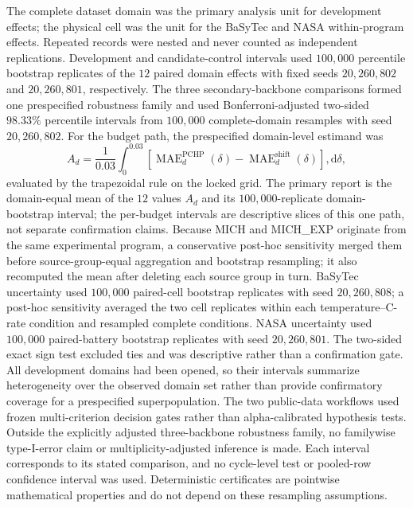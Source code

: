 \documentclass[11pt]{article}
\begin{document}
The complete dataset domain was the primary analysis unit for development effects; the physical cell was the unit for the BaSyTec and NASA within-program effects. Repeated records were nested and never counted as independent replications. Development and candidate-control intervals used $100{,}000$ percentile bootstrap replicates of the $12$ paired domain effects with fixed seeds $20{,}260{,}802$ and $20{,}260{,}801$, respectively. The three secondary-backbone comparisons formed one prespecified robustness family and used Bonferroni-adjusted two-sided $98.33\%$ percentile intervals from $100{,}000$ complete-domain resamples with seed $20{,}260{,}802$. For the budget path, the prespecified domain-level estimand was
\begin{equation}
A_d=\frac{1}{0.03}\int_{0}^{0.03}
\left[\operatorname{MAE}^{\mathrm{PCHP}}_d(\delta)-
\operatorname{MAE}^{\mathrm{shift}}_d(\delta)\right],\mathrm d\delta,
\label{eq:budget_auc}
\end{equation}
evaluated by the trapezoidal rule on the locked grid. The primary report is the domain-equal mean of the $12$ values $A_d$ and its $100{,}000$-replicate domain-bootstrap interval; the per-budget intervals are descriptive slices of this one path, not separate confirmation claims. Because MICH and MICH\_EXP originate from the same experimental program, a conservative post-hoc sensitivity merged them before source-group-equal aggregation and bootstrap resampling; it also recomputed the mean after deleting each source group in turn. BaSyTec uncertainty used $100{,}000$ paired-cell bootstrap replicates with seed $20{,}260{,}808$; a post-hoc sensitivity averaged the two cell replicates within each temperature--C-rate condition and resampled complete conditions. NASA uncertainty used $100{,}000$ paired-battery bootstrap replicates with seed $20{,}260{,}801$. The two-sided exact sign test excluded ties and was descriptive rather than a confirmation gate. All development domains had been opened, so their intervals summarize heterogeneity over the observed domain set rather than provide confirmatory coverage for a prespecified superpopulation. The two public-data workflows used frozen multi-criterion decision gates rather than alpha-calibrated hypothesis tests. Outside the explicitly adjusted three-backbone robustness family, no familywise type-I-error claim or multiplicity-adjusted inference is made. Each interval corresponds to its stated comparison, and no cycle-level test or pooled-row confidence interval was used. Deterministic certificates are pointwise mathematical properties and do not depend on these resampling assumptions.
\end{document}

